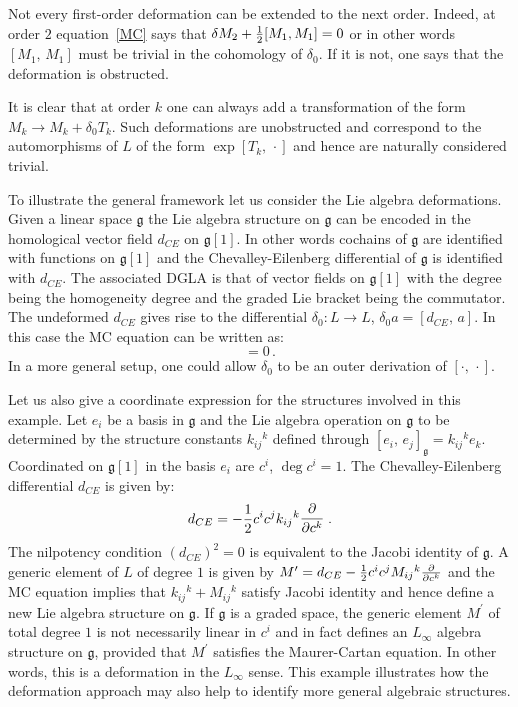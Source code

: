 \documentclass[a4paper,12pt]{article}
\numberwithin{equation}{section} %
\renewcommand{\d}{\partial}
\newcommand{\commut}[2]{[#1{,}\,#2]}
\newcommand{\half}{\mathchoice{%
    \ffrac{1}{2}}{\frac{1}{2}}{\frac{1}{2}}{\frac{1}{2}}}
\newcommand{\hhalf}{\frac{1}{2}}
\newcommand{\ffrac}[2]{\raisebox{.5pt}%
  {\footnotesize$\displaystyle\frac{#1}{#2}$}\kern1pt}
\newcommand{\dl}[1]{\mathchoice{\ffrac{\d}{\d #1}}{\frac{\d}{\d #1}}{\ffrac{\d}{\d #1}}{\ffrac{\d}{\d #1}}}
\newcommand{\Liealg}{\mathfrak}
\newcommand{\algg}{\Liealg{g}}
\begin{document}
Not every first-order deformation can be extended to the next order. Indeed,
at order $2$ equation~\eqref{MC} says that $\delta M_2+\half\commut{M_1}{M_1}=0$ or in other words $\commut{M_1}{M_1}$ must be trivial in the cohomology of $\delta_0$. If it is not, one says that the deformation is obstructed.

It is clear that at order $k$ one can always add a transformation of the form  $M_k \to M_k+\delta_0 T_k$. Such deformations are unobstructed and correspond to the automorphisms of $L$ of the form $\exp{\commut{T_k}{\cdot}}$ and hence are naturally considered trivial.

To illustrate the general framework let us consider the Lie algebra deformations. Given a linear space $\algg$ the Lie algebra structure on $\algg$ can be encoded in the homological vector field $d_{CE}$ on $\algg[1]$. In other words cochains of $\algg$ are identified with functions on $\algg[1]$ and the Chevalley-Eilenberg differential of $\algg$ is identified with $d_{CE}$. The associated DGLA is that of vector fields on $\algg[1]$ with the degree being the homogeneity degree and the graded Lie bracket being the commutator. The undeformed $d_{CE}$ gives rise to the differential $\delta_0:L\to L$, $\delta_0 a=\commut{d_{CE}}{a}$. In this case the MC equation can be written as:
\begin{equation}
\commut{d_{CE}+M}{d_{CE}+M}=0\,.
\end{equation}
In a more general setup, one could allow $\delta_0$ to be an outer derivation of $\commut{\cdot}{\cdot}$.


Let us also give a coordinate expression for the structures involved in this example. Let $e_i$ be a basis in $\algg$
and the Lie algebra operation on $\algg$ to be determined by the structure constants $k_{ij}{}^k$ defined through $\commut{e_i}{e_j}_{\algg}=k_{ij}{}^k e_k$. Coordinated on $\algg[1]$ in the basis $e_i$ are $c^i$, $\deg{c^i=1}$. The Chevalley-Eilenberg differential $d_{CE}$ is given by:
\begin{equation}
    \label{ce_differential}
    d_{CE}=-\hhalf c^ic^j k_{ij}{}^k\dl{c^k}\,.
\end{equation}
The nilpotency condition $(d_{CE})^2=0$ is equivalent to the Jacobi identity of $\algg$. A generic element of $L$ of degree $1$ is given by $M^\prime=d_{CE}-\half c^ic^j M_{ij}{}^k\dl{c^k}$ and the MC equation implies that $k_{ij}{}^k+M_{ij}{}^k$ satisfy Jacobi identity and hence define a new Lie algebra structure on $\algg$. If $\algg$ is  a graded space, the generic element $M^\prime$ of total degree $1$ is not necessarily linear in $c^i$ and in fact defines an $L_{\infty}$ algebra structure on $\algg$, provided that $M^\prime$ satisfies the Maurer-Cartan equation. In other words, this is a deformation in the $L_{\infty}$ sense. This example illustrates how the deformation approach may also help to identify more general algebraic structures. 
\end{document}
